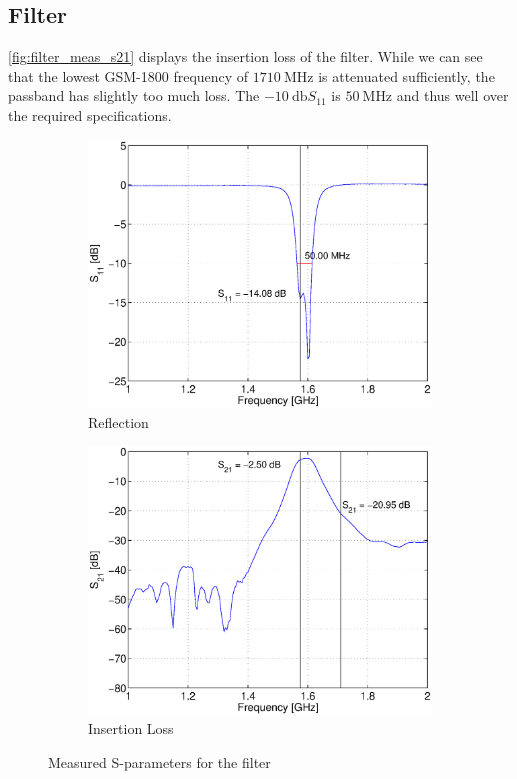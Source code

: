 \documentclass[a4paper]{article}        %
\begin{document}
	\subsection{Filter}
  \autoref{fig:filter_meas_s21} displays the insertion loss of the filter. While we can see that the lowest GSM-1800 frequency of $\SI{1710}{\mega\hertz}$ is attenuated sufficiently, the passband has slightly too much loss.
  The $\SI{-10}{\decibel} S_{11}$ is $\SI{50}{\mega\hertz}$ and thus well over the required specifications. 
  \begin{figure}[H]
    \centering
    \begin{subfigure}{0.5\textwidth}
      \centering
      \includegraphics[width=\textwidth]{fig/Filter/s11_filter.eps}
      \caption{Reflection}
      \label{filter_meas_s11}
    \end{subfigure}%
    \begin{subfigure}{0.5\textwidth}
      \centering
      \includegraphics[width=\textwidth]{fig/Filter/s21_filter.eps}
      \caption{Insertion Loss}
      \label{fig:filter_meas_s21}
    \end{subfigure}
    \caption{Measured S-parameters for the filter}
    \label{fig:filter_meas_sparams}
  \end{figure}
\end{document}
